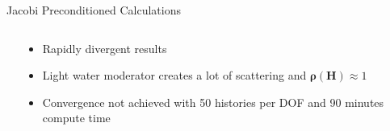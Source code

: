 \documentclass{beamer}
\begin{document}
\begin{frame}{Jacobi Preconditioned Calculations}
\begin{columns}
\begin{column}{0.5\textwidth}
    \end{column}

    \begin{column}{0.5\textwidth}
      \begin{itemize}
      \item Rapidly divergent results
        \medskip
      \item Light water moderator creates a lot of scattering and
        $\mathbf{\rho}(\mathbf{H}) \approx 1$
        \medskip
      \item Convergence not achieved with 50 histories per DOF and 90
        minutes compute time
      \end{itemize}
    \end{column}

  \end{columns}

\end{frame}
\end{document}
